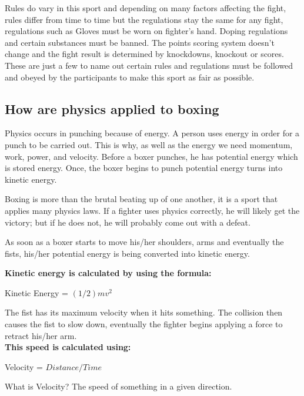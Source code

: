 \documentclass[a4paper,12pt]{report}
\begin{document}
Rules do vary in this sport and depending on many factors affecting the fight, rules differ from time to time but the regulations stay the same for any fight, regulations such as
Gloves must be worn on fighter's hand.
Doping regulations and certain substances must be banned.
The points scoring system doesn't change and the fight result is determined by knockdowns, knockout or scores.
These are just a few to name out certain rules and regulations must be followed and obeyed by the participants to make this sport as fair as possible. 

\subsection{How are physics applied to boxing}
Physics occurs in punching because of energy. A person uses energy in order for a punch to be carried out. This is why, as well as the energy we need momentum, work, power, and velocity. Before a boxer punches, he has potential energy which is stored energy. Once, the boxer begins to punch potential energy turns into kinetic energy.

Boxing is more than the brutal beating up of one another, it is a sport that applies many physics laws. If a fighter uses physics correctly, he will likely get the victory; but if he does not, he will probably come out with a defeat.

As soon as a boxer starts to move his/her shoulders, arms and eventually the fists, his/her potential energy is being converted into kinetic energy.

\textbf{Kinetic energy is calculated by using the formula:}

    Kinetic Energy = $(1/2)mv^2$

The fist has its maximum velocity when it hits something. The collision then causes the fist to slow down, eventually the fighter begins applying a force to retract his/her arm.\\

\textbf{This speed is calculated using:}

Velocity = $Distance / Time$

What is Velocity? The speed of something in a given direction.\cite{boxPhysics}
\end{document}
